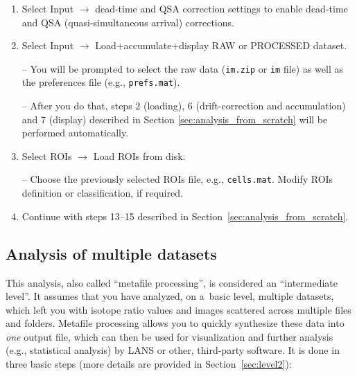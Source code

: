 \documentclass[a4paper, 11pt]{article}
\newcommand{\ttt}[1]{\texttt{#1}}
\newcommand{\lans}[1]{{\color{magenta}#1}}
\newcommand\ra{\rightarrow}
\newcommand\addon[1]{-- {\small #1}}
\begin{document}
\begin{enumerate}

\item Select \lans{Input} $\ra$ \lans{dead-time and QSA correction settings} to enable dead-time and QSA (quasi-simultaneous arrival) corrections.

\item Select \lans{Input} $\ra$ \lans{Load+accumulate+display RAW or PROCESSED dataset}. 

\addon{You will be prompted to select the raw data (\ttt{im.zip} or \ttt{im} file) as well as the preferences file (e.g., \ttt{prefs.mat}). }

\addon{After you do that, steps 2 (loading), 6 (drift-correction and accumulation) and 7 (display) described in Section \ref{sec:analysis_from_scratch} will be performed automatically.}
 
\item Select \lans{ROIs} $\ra$ \lans{Load ROIs from disk}.

\addon{Choose the previously selected ROIs file, e.g., \ttt{cells.mat}. Modify ROIs definition or classification, if required.}

\item Continue with steps 13--15 described in Section~\ref{sec:analysis_from_scratch}.

\end{enumerate}


\subsection{Analysis of multiple datasets}

This analysis, also called ``metafile processing'', is considered an ``intermediate level''. It assumes that you have analyzed, on a~basic level, multiple datasets, which left you with isotope ratio values and images scattered across multiple files and folders. Metafile processing allows you to quickly synthesize these data into \emph{one} output file, which can then be used for visualization and further analysis (e.g., statistical analysis) by LANS or other, third-party software. It is done in three basic steps (more details are provided in Section~\ref{sec:level2}):
\end{document}
